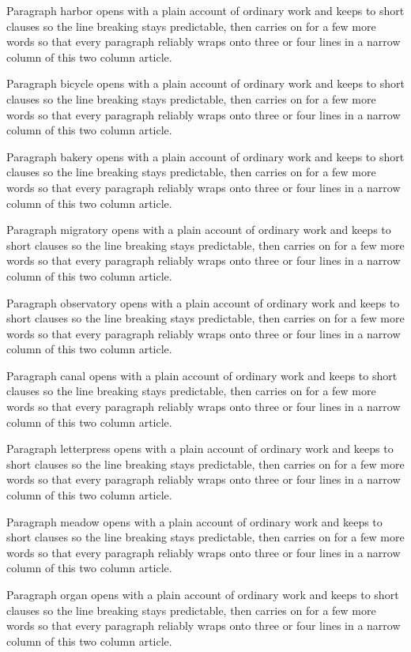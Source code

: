 \documentclass[twocolumn]{article}
\begin{document}
Paragraph harbor opens with a plain account of ordinary work and keeps to short
clauses so the line breaking stays predictable, then carries on for a few more
words so that every paragraph reliably wraps onto three or four lines in a
narrow column of this two column article.

Paragraph bicycle opens with a plain account of ordinary work and keeps to short
clauses so the line breaking stays predictable, then carries on for a few more
words so that every paragraph reliably wraps onto three or four lines in a
narrow column of this two column article.

Paragraph bakery opens with a plain account of ordinary work and keeps to short
clauses so the line breaking stays predictable, then carries on for a few more
words so that every paragraph reliably wraps onto three or four lines in a
narrow column of this two column article.

Paragraph migratory opens with a plain account of ordinary work and keeps to short
clauses so the line breaking stays predictable, then carries on for a few more
words so that every paragraph reliably wraps onto three or four lines in a
narrow column of this two column article.

Paragraph observatory opens with a plain account of ordinary work and keeps to short
clauses so the line breaking stays predictable, then carries on for a few more
words so that every paragraph reliably wraps onto three or four lines in a
narrow column of this two column article.

Paragraph canal opens with a plain account of ordinary work and keeps to short
clauses so the line breaking stays predictable, then carries on for a few more
words so that every paragraph reliably wraps onto three or four lines in a
narrow column of this two column article.

Paragraph letterpress opens with a plain account of ordinary work and keeps to short
clauses so the line breaking stays predictable, then carries on for a few more
words so that every paragraph reliably wraps onto three or four lines in a
narrow column of this two column article.

Paragraph meadow opens with a plain account of ordinary work and keeps to short
clauses so the line breaking stays predictable, then carries on for a few more
words so that every paragraph reliably wraps onto three or four lines in a
narrow column of this two column article.

Paragraph organ opens with a plain account of ordinary work and keeps to short
clauses so the line breaking stays predictable, then carries on for a few more
words so that every paragraph reliably wraps onto three or four lines in a
narrow column of this two column article.
\end{document}
